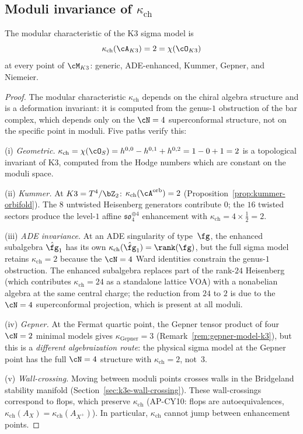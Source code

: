 \subsection{Moduli invariance of $\kappa_{\mathrm{ch}}$}
\label{subsec:k3-kappa-moduli-invariance}

\begin{theorem}
\label{thm:k3-kappa-moduli-invariance}
\ClaimStatusProvedHere
The modular characteristic of the K3 sigma model is
\[
 \kappa_{\mathrm{ch}}(\cA_{K3}) = 2 = \chi(\cO_{K3})
\]
at every point of $\cM_{K3}$: generic, ADE-enhanced, Kummer,
Gepner, and Niemeier.
\end{theorem}

\begin{proof}
The modular characteristic $\kappa_{\mathrm{ch}}$ depends on the
chiral algebra structure and is a deformation invariant:
it is computed from the genus-$1$ obstruction of the bar complex,
which depends only on the $\cN = 4$ superconformal structure, not
on the specific point in moduli.  Five paths verify this:

(i) \emph{Geometric.} $\kappa_{\mathrm{ch}} = \chi(\cO_S) =
h^{0,0} - h^{0,1} + h^{0,2} = 1 - 0 + 1 = 2$ is a topological
invariant of K3, computed from the Hodge numbers which are
constant on the moduli space.

(ii) \emph{Kummer.} At $K3 = T^4/\bZ_2$:
$\kappa_{\mathrm{ch}}(\cA^{\mathrm{orb}}) = 2$
(Proposition~\ref{prop:kummer-orbifold}).  The $8$ untwisted
Heisenberg generators contribute $0$; the $16$ twisted sectors
produce the level-$1$ affine $\mathfrak{so}_4^{\oplus 4}$
enhancement with $\kappa_{\mathrm{ch}} = 4 \times \frac{1}{2} = 2$.

(iii) \emph{ADE invariance.} At an ADE singularity of type~$\fg$,
the enhanced subalgebra $\hat{\fg}_1$ has its own
$\kappa_{\mathrm{ch}}(\hat{\fg}_1) = \rank(\fg)$, but the full sigma model
retains $\kappa_{\mathrm{ch}} = 2$ because the $\cN = 4$ Ward identities
constrain the genus-$1$ obstruction.  The enhanced subalgebra replaces
part of the rank-$24$ Heisenberg (which contributes $\kappa_{\mathrm{ch}} = 24$
as a standalone lattice VOA) with a nonabelian algebra at the same
central charge; the reduction from $24$ to $2$ is due to the
$\cN = 4$ superconformal projection, which is present at all moduli.

(iv) \emph{Gepner.} At the Fermat quartic point, the Gepner tensor
product of four $\cN = 2$ minimal models gives
$\kappa_{\mathrm{Gepner}} = 3$ (Remark~\ref{rem:gepner-model-k3}), but this
is a \emph{different algebraization route}: the physical sigma model
at the Gepner point has the full $\cN = 4$ structure with
$\kappa_{\mathrm{ch}} = 2$, not~$3$.

(v) \emph{Wall-crossing.}  Moving between moduli points crosses walls
in the Bridgeland stability manifold (Section~\ref{sec:k3e-wall-crossing}).  These
wall-crossings correspond to flops, which preserve $\kappa_{\mathrm{ch}}$ (AP-CY10:
flops are autoequivalences, $\kappa_{\mathrm{ch}}(A_X) = \kappa_{\mathrm{ch}}(A_{X^+})$).  In
particular, $\kappa_{\mathrm{ch}}$ cannot jump between enhancement points.
\end{proof}

